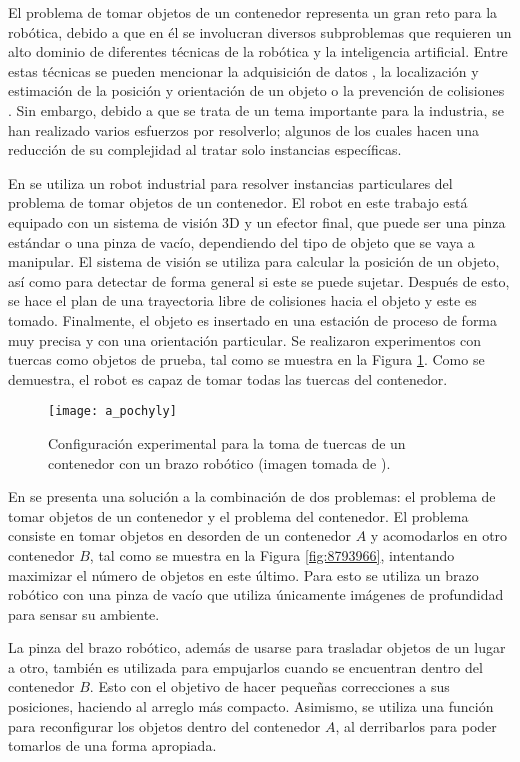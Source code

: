 El problema de tomar objetos de un contenedor representa un gran reto para la robótica, debido a que en él se involucran diversos subproblemas que requieren un alto dominio de diferentes técnicas de la robótica y la inteligencia artificial.
Entre estas técnicas se pueden mencionar la adquisición de datos \cite{CHEN1992145}, la localización y estimación de la posición y orientación de un objeto \cite{5152739} o la prevención de colisiones \cite{6239716}\cite{5756828}.
Sin embargo, debido a que se trata de un tema importante para la industria, se han realizado varios esfuerzos por resolverlo; algunos de los cuales hacen una reducción de su complejidad al tratar solo instancias específicas.

En \cite{5756828} se utiliza un robot industrial para resolver instancias particulares del problema de tomar objetos de un contenedor.
El robot en este trabajo está equipado con un sistema de visión 3D y un efector final, que puede ser una pinza estándar o una pinza de vacío, dependiendo del tipo de objeto que se vaya a manipular.
El sistema de visión se utiliza para calcular la posición de un objeto, así como para detectar de forma general si este se puede sujetar.
Después de esto, se hace el plan de una trayectoria libre de colisiones hacia el objeto y este es tomado.
Finalmente, el objeto es insertado en una estación de proceso de forma muy precisa y con una orientación particular.
Se realizaron experimentos con tuercas como objetos de prueba, tal como se muestra en la Figura \ref{fig:5756828}.
Como se demuestra, el robot es capaz de tomar todas las tuercas del contenedor.
%
\begin{figure}[H]
	\texttt{[image: a\_pochyly]}%
	\caption{Configuración experimental para la toma de tuercas de un contenedor con un brazo robótico (imagen tomada de \cite{5756828}).}%
	\label{fig:5756828}%
\end{figure}
%
En \cite{8793966} se presenta una solución a la combinación de dos problemas: el problema de tomar objetos de un contenedor y el problema del contenedor.
El problema consiste en tomar objetos en desorden de un contenedor $A$ y acomodarlos en otro contenedor $B$, tal como se muestra en la Figura \ref{fig:8793966}, intentando maximizar el número de objetos en este último.
Para esto se utiliza un brazo robótico con una pinza de vacío que utiliza únicamente imágenes de profundidad para sensar su ambiente.

La pinza del brazo robótico, además de usarse para trasladar objetos de un lugar a otro, también es utilizada para empujarlos cuando se encuentran dentro del contenedor $B$.
Esto con el objetivo de hacer pequeñas correcciones a sus posiciones, haciendo al arreglo más compacto.
Asimismo, se utiliza una función para reconfigurar los objetos dentro del contenedor $A$, al derribarlos para poder tomarlos de una forma apropiada.

